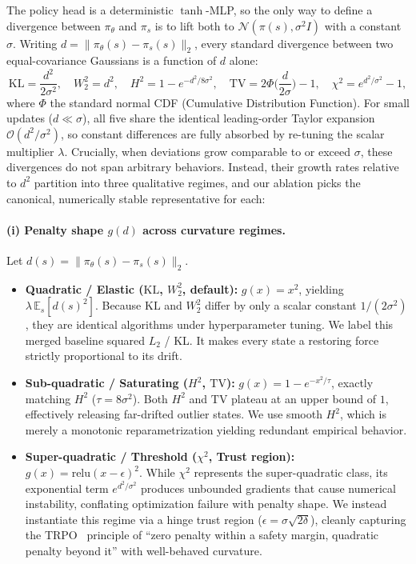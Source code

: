 \documentclass{article} %
\begin{document}
The policy head is a deterministic $\tanh$-MLP, so the only way to define a divergence between $\pi_\theta$ and $\pi_s$ is to lift both to $\mathcal{N}(\pi(s),\sigma^2 I)$ with a constant $\sigma$. Writing $d = \lVert\pi_\theta(s)-\pi_s(s)\rVert_2$, every standard divergence between two equal-covariance Gaussians is a function of $d$ alone:
\begin{equation}
\mathrm{KL} = \frac{d^2}{2\sigma^2},\quad
W_2^2 = d^2,\quad
H^2 = 1-e^{-d^2/8\sigma^2},\quad
\mathrm{TV} = 2\Phi\!\Big(\frac{d}{2\sigma}\Big)-1,\quad
\chi^2 = e^{d^2/\sigma^2}-1,
\label{eq:divergences}
\end{equation}
where $\Phi$ the standard normal CDF (Cumulative Distribution Function). For small updates ($d \ll \sigma$), all five share the identical leading-order Taylor expansion $\mathcal{O}(d^2/\sigma^2)$, so constant differences are fully absorbed by re-tuning the scalar multiplier $\lambda$. Crucially, when deviations grow comparable to or exceed $\sigma$, these divergences do not span arbitrary behaviors. Instead, their growth rates relative to $d^2$ partition into three qualitative regimes, and our ablation picks the canonical, numerically stable representative for each:

\paragraph{(i) Penalty shape $g(d)$ across curvature regimes.}
Let $d(s) = \lVert \pi_\theta(s)-\pi_s(s)\rVert_2$.
\begin{itemize}
\item \textbf{Quadratic / Elastic ($\mathrm{KL}$, $W_2^2$, default):} $g(x) = x^2$, yielding $\lambda\,\mathbb{E}_s[d(s)^2]$. Because $\mathrm{KL}$ and $W_2^2$ differ by only a scalar constant $1/(2\sigma^2)$, they are identical algorithms under hyperparameter tuning. We label this merged baseline squared $L_2$ / KL. It makes every state a restoring force strictly proportional to its drift.
\item \textbf{Sub-quadratic / Saturating ($H^2$, $\mathrm{TV}$):} $g(x) = 1 - e^{-x^2/\tau}$, exactly matching $H^2$ ($\tau = 8\sigma^2$). Both $H^2$ and $\mathrm{TV}$ plateau at an upper bound of $1$, effectively releasing far-drifted outlier states. We use smooth $H^2$, which is merely a monotonic reparametrization yielding redundant empirical behavior.
\item \textbf{Super-quadratic / Threshold ($\chi^2$, Trust region):} $g(x) = \mathrm{relu}(x - \epsilon)^2$. While $\chi^2$ represents the super-quadratic class, its exponential term $e^{d^2/\sigma^2}$ produces unbounded gradients that cause numerical instability, conflating optimization failure with penalty shape. We instead instantiate this regime via a hinge trust region ($\epsilon = \sigma\sqrt{2\delta}$), cleanly capturing the TRPO~\citep{schulman2015trust} principle of ``zero penalty within a safety margin, quadratic penalty beyond it'' with well-behaved curvature.
\end{itemize}
\end{document}
